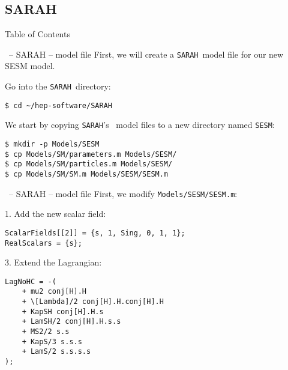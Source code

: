 \documentclass[11pt]{beamer}
\newcommand{\SARAH}{\texttt{SARAH}}
\newcommand{\SM}{\text{SM}}
\begin{document}

\subsection{SARAH}


\begin{frame}{Table of Contents}
\end{frame}


\begin{frame}[fragile]{\insertsection\ -- SARAH -- model file}
  First, we will create a \SARAH\ model file for our new SESM model.

  \bigskip

  Go into the \SARAH\ directory:
  \begin{lstlisting}
$ cd ~/hep-software/SARAH\end{lstlisting}%
  We start by copying \SARAH's \SM\ model files to a new directory named
  \texttt{SESM}:
  \begin{lstlisting}
$ mkdir -p Models/SESM
$ cp Models/SM/parameters.m Models/SESM/
$ cp Models/SM/particles.m Models/SESM/
$ cp Models/SM/SM.m Models/SESM/SESM.m\end{lstlisting}%
\end{frame}


\begin{frame}[fragile]{\insertsection\ -- SARAH -- model file}
  First, we modify \texttt{Models/SESM/SESM.m}:

  \medskip

  1. Add the new scalar field:
  \begin{lstlisting}
ScalarFields[[2]] = {s, 1, Sing, 0, 1, 1};
RealScalars = {s};\end{lstlisting}
  3. Extend the Lagrangian:
  \begin{lstlisting}
LagNoHC = -(
    + mu2 conj[H].H
    + \[Lambda]/2 conj[H].H.conj[H].H
    + KapSH conj[H].H.s
    + LamSH/2 conj[H].H.s.s
    + MS2/2 s.s
    + KapS/3 s.s.s
    + LamS/2 s.s.s.s
);\end{lstlisting}
\end{frame}

\end{document}
